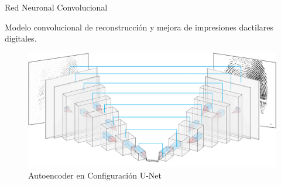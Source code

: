 \documentclass[12pt]{beamer}
\begin{document}
\begin{frame}{Red Neuronal Convolucional}

    Modelo convolucional de reconstrucción y mejora de impresiones dactilares digitales.

    \begin{figure}[h]
        \includegraphics[scale=0.42]{figs/layers_nn_u.PNG}
        \caption{Autoencoder en Configuración U-Net}
    \end{figure}

\end{frame}
\end{document}
